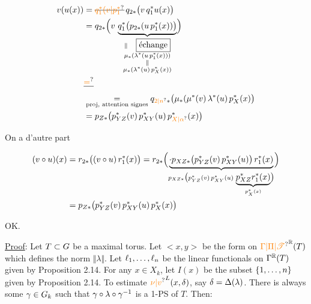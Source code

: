 
\[
\begin{aligned}
v(u(x))&=\deleted{\unsure{q_1^*(v|p_1^*}}\,q_{2*}\bigl(v\,q_1^*u(x)\bigr)\\
&=q_{2*}\Bigl(v\,\underbrace{q_1^*\bigl(p_{2*}(u\,p_1^*(x))\bigr)}_{\substack{\Vert\quad\boxed{\text{échange}}\\\mu_*(\lambda^*(u\,p_1^*(x)))\\\Vert\\\mu_*(\lambda^*(u)\,p_X^*(x))}}\Bigr)\\
&\deleted{\unsure{=}}\\
&\underset{\text{proj, attention signes}}{=}q_{\unsure{2|n}*}\bigl(\mu_*(\mu^*(v)\,\lambda^*(u)\,p_X^*(x)\bigr)\\
&=p_{Z*}\bigl(p_{YZ}^*(v)\,p_{XY}^*(u)\,p_{\unsure{X|\alpha}}^*(x)\bigr)
\end{aligned}
\]

On a d'autre part


\[
\begin{aligned}
(v\circ u)(x)&=r_{2*}\bigl((v\circ u)\,r_1^*(x)\bigr)
=r_{2*}\Bigl(\underbrace{\cdot p_{XZ*}\bigl(p_{YZ}^*(v)\,p_{XY}^*(u)\bigr)\,r_1^*(x)}_{p_{XZ*}\bigl(p_{YZ}^*(v)\,p_{XY}^*(u)\,\underbrace{p_{XZ}^*r_1^*(x)}_{p_X^*(x)}\bigr)}\Bigr)\\
&=p_{Z*}\bigl(p_{YZ}^*(v)\,p_{XY}^*(u)\,p_X^*(x)\bigr)
\end{aligned}
\]

OK.


\uline{Proof}: Let $T\subset G$ be a maximal torus. Let $<x,y>$ be the form on $\handwritten{\unsure{\Gamma|\Pi|\mathscr T}^{\mathbb R}}(T)$ which defines the norm $\Vert\lambda\Vert$. Let $\ell_1,\ldots,\ell_n$ be the linear functionals on $\Gamma^{\mathbb R}(T)$ given by Proposition 2.14. For any $x\in X_k$, let $I(x)$ be the subset $\{1,\ldots,n\}$ given by Proposition 2.14. To estimate $\handwritten{\unsure{\nu|v}}^L(x,\handwritten{\delta})$, say $\delta=\Delta(\lambda)$. There is always some $\gamma\in G_k$ such that $\gamma\circ\lambda\circ\gamma^{-1}$ is a 1-PS of $T$. Then:

